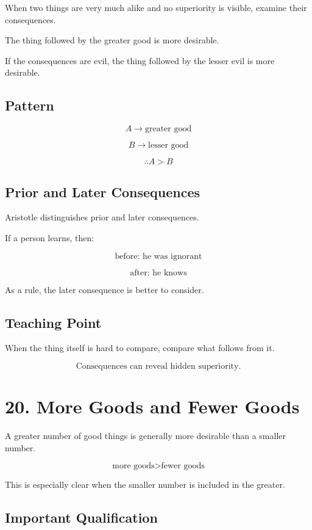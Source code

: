\documentclass[12pt]{article}
\begin{document}
When two things are very much alike and no superiority is visible, examine their
consequences.

The thing followed by the greater good is more desirable.

If the consequences are evil, the thing followed by the lesser evil is more
desirable.

\subsection*{Pattern}

\[
A \rightarrow \text{greater good}
\]

\[
B \rightarrow \text{lesser good}
\]

\[
\therefore A > B
\]

\subsection*{Prior and Later Consequences}

Aristotle distinguishes prior and later consequences.

If a person learns, then:

\[
\text{before: he was ignorant}
\]

\[
\text{after: he knows}
\]

As a rule, the later consequence is better to consider.

\subsection*{Teaching Point}

When the thing itself is hard to compare, compare what follows from it.

\[
\boxed{
\text{Consequences can reveal hidden superiority.}
}
\]

\section*{20. More Goods and Fewer Goods}

A greater number of good things is generally more desirable than a smaller
number.

\[
\text{more goods} > \text{fewer goods}
\]

This is especially clear when the smaller number is included in the greater.

\subsection*{Important Qualification}
\end{document}
